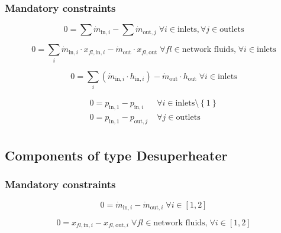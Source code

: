 \subsubsection{Mandatory constraints}

\begin{equation}
\label{eq:Merge_mass_flow_constraints}
0 =\sum\dot{m}_{\mathrm{in},i}-\sum\dot{m}_{\mathrm{out},j}\;\forall i \in \text{inlets}, \forall j \in \text{outlets}
\end{equation}

\begin{equation}
\label{eq:Merge_fluid_constraints}
0=\sum_i \dot{m}_{\mathrm{in,}i} \cdot x_{fl\mathrm{,in,}i}- \dot {m}_\mathrm{out} \cdot x_{fl\mathrm{,out}}\; \forall fl \in \text{network fluids,} \; \forall i \in\text{inlets}
\end{equation}

\begin{equation}
\label{eq:Merge_energy_balance_constraints}
0=\sum_i\left(\dot{m}_{\mathrm{in,}i}\cdot h_{\mathrm{in,}i}\right) - \dot{m}_\mathrm{out} \cdot h_\mathrm{out} \; \forall i \in \text{inlets}
\end{equation}

\begin{equation}
\label{eq:Merge_pressure_constraints}
\begin{split}
0 = p_\mathrm{in,1} - p_{\mathrm{in,}i} & \; \forall i \in \text{inlets} \setminus \left\lbrace 1\right\rbrace\\
0 = p_\mathrm{in,1} - p_{\mathrm{out,}j} & \; \forall j \in \text{outlets}\\
\end{split}
\end{equation}


\subsection{Components of type Desuperheater}

\subsubsection{Mandatory constraints}

\begin{equation}
\label{eq:Desuperheater_mass_flow_constraints}
0=\dot{m}_{\mathrm{in,}i}-\dot{m}_{\mathrm{out,}i}\; \forall i \in [1, 2]
\end{equation}

\begin{equation}
\label{eq:Desuperheater_fluid_constraints}
0=x_{fl\mathrm{,in,}i}-x_{fl\mathrm{,out,}i}\;\forall fl \in\text{network fluids,}\; \forall i \in [1, 2]
\end{equation}

